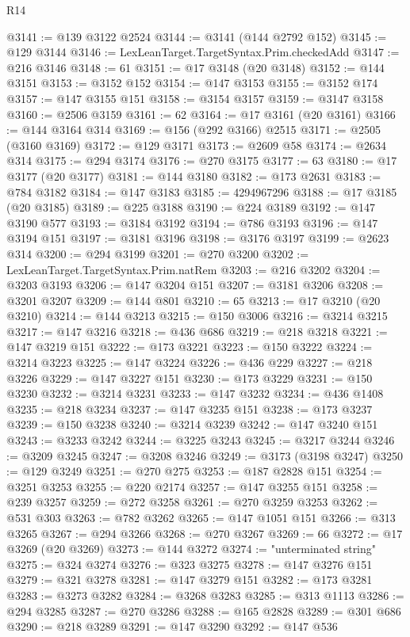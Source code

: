\begin{lexlean}{R14}
\begin{coremodule}
@3141 := @139 @3122 @2524
@3144 := @3141 (@144 @2792 @152)
@3145 := @129 @3144
@3146 := LexLeanTarget.TargetSyntax.Prim.checkedAdd
@3147 := @216 @3146
@3148 := 61
@3151 := @17 @3148 (@20 @3148)
@3152 := @144 @3151
@3153 := @3152 @152
@3154 := @147 @3153
@3155 := @3152 @174
@3157 := @147 @3155 @151
@3158 := @3154 @3157
@3159 := @3147 @3158
@3160 := @2506 @3159
@3161 := 62
@3164 := @17 @3161 (@20 @3161)
@3166 := @144 @3164 @314
@3169 := @156 (@292 @3166) @2515
@3171 := @2505 (@3160 @3169)
@3172 := @129 @3171
@3173 := @2609 @58
@3174 := @2634 @314
@3175 := @294 @3174
@3176 := @270 @3175
@3177 := 63
@3180 := @17 @3177 (@20 @3177)
@3181 := @144 @3180
@3182 := @173 @2631
@3183 := @784 @3182
@3184 := @147 @3183
@3185 := 4294967296
@3188 := @17 @3185 (@20 @3185)
@3189 := @225 @3188
@3190 := @224 @3189
@3192 := @147 @3190 @577
@3193 := @3184 @3192
@3194 := @786 @3193
@3196 := @147 @3194 @151
@3197 := @3181 @3196
@3198 := @3176 @3197
@3199 := @2623 @314
@3200 := @294 @3199
@3201 := @270 @3200
@3202 := LexLeanTarget.TargetSyntax.Prim.natRem
@3203 := @216 @3202
@3204 := @3203 @3193
@3206 := @147 @3204 @151
@3207 := @3181 @3206
@3208 := @3201 @3207
@3209 := @144 @801
@3210 := 65
@3213 := @17 @3210 (@20 @3210)
@3214 := @144 @3213
@3215 := @150 @3006
@3216 := @3214 @3215
@3217 := @147 @3216
@3218 := @436 @686
@3219 := @218 @3218
@3221 := @147 @3219 @151
@3222 := @173 @3221
@3223 := @150 @3222
@3224 := @3214 @3223
@3225 := @147 @3224
@3226 := @436 @229
@3227 := @218 @3226
@3229 := @147 @3227 @151
@3230 := @173 @3229
@3231 := @150 @3230
@3232 := @3214 @3231
@3233 := @147 @3232
@3234 := @436 @1408
@3235 := @218 @3234
@3237 := @147 @3235 @151
@3238 := @173 @3237
@3239 := @150 @3238
@3240 := @3214 @3239
@3242 := @147 @3240 @151
@3243 := @3233 @3242
@3244 := @3225 @3243
@3245 := @3217 @3244
@3246 := @3209 @3245
@3247 := @3208 @3246
@3249 := @3173 (@3198 @3247)
@3250 := @129 @3249
@3251 := @270 @275
@3253 := @187 @2828 @151
@3254 := @3251 @3253
@3255 := @220 @2174
@3257 := @147 @3255 @151
@3258 := @239 @3257
@3259 := @272 @3258
@3261 := @270 @3259 @3253
@3262 := @531 @303
@3263 := @782 @3262
@3265 := @147 @1051 @151
@3266 := @313 @3265
@3267 := @294 @3266
@3268 := @270 @3267
@3269 := 66
@3272 := @17 @3269 (@20 @3269)
@3273 := @144 @3272
@3274 := "unterminated string"
@3275 := @324 @3274
@3276 := @323 @3275
@3278 := @147 @3276 @151
@3279 := @321 @3278
@3281 := @147 @3279 @151
@3282 := @173 @3281
@3283 := @3273 @3282
@3284 := @3268 @3283
@3285 := @313 @1113
@3286 := @294 @3285
@3287 := @270 @3286
@3288 := @165 @2828
@3289 := @301 @686
@3290 := @218 @3289
@3291 := @147 @3290
@3292 := @147 @536

\end{coremodule}
\end{lexlean}
